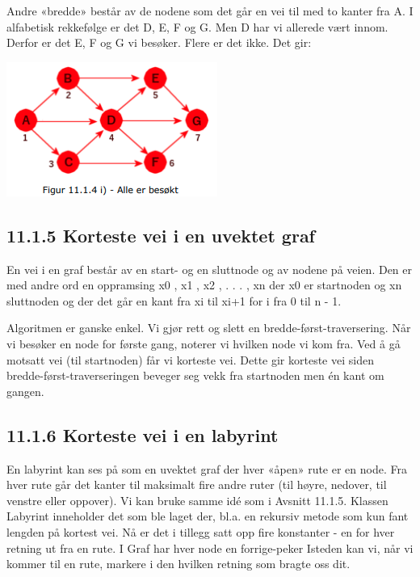 \documentclass[11pt]{article}
\begin{document}
            \begin{multicols}{2}
                Andre «bredde» består av de nodene som det går en vei til med to kanter fra A. I alfabetisk
                rekkefølge er det D, E, F og G. Men D har vi allerede vært innom. Derfor er det E, F og G vi
                besøker. Flere er det ikke. Det gir:  

                \columnbreak

                \includegraphics[center]{f-11.1.4i.png}
                
            \end{multicols}

    \subsection{11.1.5 Korteste vei i en uvektet graf}
        En vei i en graf består av en start- og en sluttnode og av nodene på veien. Den er med andre
        ord en oppramsing x0 , x1 , x2 , . . . , xn der x0 er startnoden og xn sluttnoden og der det går
        en kant fra xi til xi+1 for i fra 0 til n - 1.

        Algoritmen er ganske enkel. Vi gjør rett og slett
        en bredde-først-traversering. Når vi besøker en node for første gang, noterer vi hvilken node
        vi kom fra. Ved å gå motsatt vei (til startnoden) får vi korteste vei. Dette gir korteste vei
        siden bredde-først-traverseringen beveger seg vekk fra startnoden men én kant om gangen.

    \subsection{11.1.6 Korteste vei i en labyrint}
        
        En labyrint kan ses på som en uvektet graf der hver «åpen» rute er en node. Fra hver rute
        går det kanter til maksimalt fire andre ruter (til høyre, nedover, til venstre eller oppover). Vi
        kan bruke samme idé som i Avsnitt 11.1.5. Klassen Labyrint inneholder det som ble laget
        der, bl.a. en rekursiv metode som kun fant lengden på kortest vei. Nå er det i tillegg satt opp
        fire konstanter - en for hver retning ut fra en rute. I Graf har hver node en forrige-peker
        Isteden kan vi, når vi kommer til en rute, markere i den hvilken retning som bragte oss dit.
\end{document}
